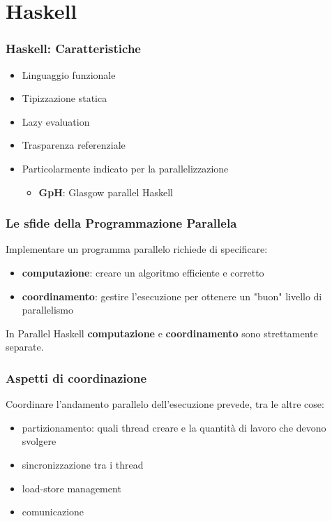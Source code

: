 \documentclass[14pt]{beamer}
\begin{document}
\section{Haskell}
\begin{frame}
\frametitle{Haskell: Caratteristiche} 
\begin{itemize}
\item Linguaggio funzionale
\item Tipizzazione statica
\item Lazy evaluation
\item Trasparenza referenziale
 \item Particolarmente indicato per la parallelizzazione
  \begin{itemize}
  \item \textbf{GpH}: Glasgow parallel Haskell
  \end{itemize}

\end{itemize}
\end{frame}


\begin{frame}
\frametitle{Le sfide della Programmazione Parallela}
Implementare un programma parallelo richiede di specificare:
\begin{itemize}
\item \textbf{computazione}: creare un algoritmo  efficiente e corretto
\item \textbf{coordinamento}: gestire l'esecuzione per ottenere un "buon" livello di parallelismo
\end{itemize}
In Parallel Haskell \textbf{computazione} e \textbf{coordinamento} sono strettamente separate.
\end{frame}

\begin{frame}
\frametitle{Aspetti di coordinazione}
Coordinare l'andamento parallelo dell'esecuzione prevede, tra le altre cose:
\begin{itemize}
\item partizionamento: quali thread creare e la quantità di lavoro che devono svolgere
\item sincronizzazione tra i thread
\item load-store management
\item comunicazione 
\end{itemize}
\end{frame}
\end{document}
